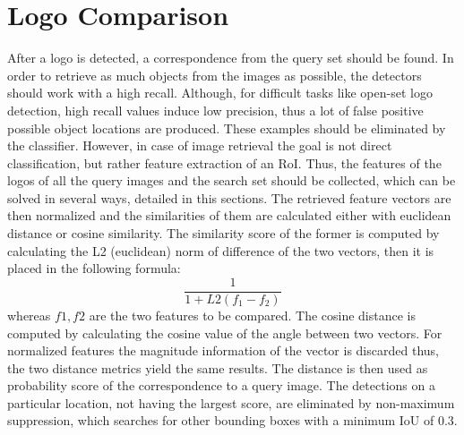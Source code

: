 \section{Logo Comparison}\label{s:logocomparison}
After a logo is detected, a correspondence from the query set should be found. In order to retrieve as much objects from the images as possible, the detectors should work with a high recall. Although, for difficult tasks like open-set logo detection, high recall values induce low precision, thus a lot of false positive possible object locations are produced. These examples should be eliminated by the classifier.
\bigbreak
However, in case of image retrieval the goal is not direct classification, but rather feature extraction of an RoI. Thus, the features of the logos of all the query images and the search set should be collected, which can be solved in several ways, detailed in this sections. The retrieved feature vectors are then normalized and the similarities of them are calculated either with euclidean distance or cosine similarity. The similarity score of the former is computed by calculating the L2 (euclidean) norm of difference of the two vectors, then it is placed in the following formula:
\begin{equation}
        \frac{1}{1 + L2(f_1 - f_2)}
        \label{eq:iou}
\end{equation}
whereas $f1, f2$ are the two features to be compared. The cosine distance is computed by calculating the cosine value of the angle between two vectors. For normalized features the magnitude information of the vector is discarded thus, the two distance metrics yield the same results. The distance is then used as probability score of the correspondence to a query image. The detections on a particular location, not having the largest score, are eliminated by non-maximum suppression, which searches for other bounding boxes with a minimum IoU of 0.3.
\bigbreak
